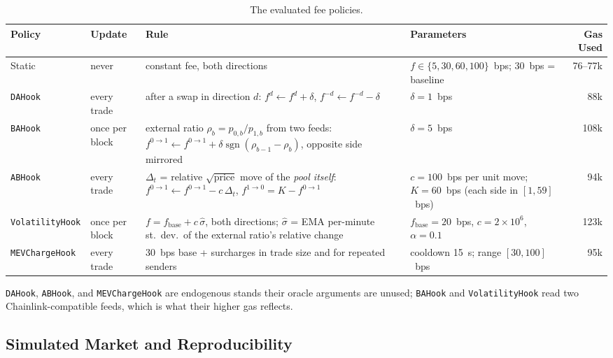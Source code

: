 \documentclass[a4paper,conference]{IEEEtran}
\begin{document}
\begin{table}[t]
  \caption{The evaluated fee policies.}
  \label{tab:policies}
  \centering
  \footnotesize
  \begin{tabular}{@{}llp{5.2cm}p{3.9cm}r@{}}
    \toprule
    \textbf{Policy} & \textbf{Update} & \textbf{Rule} &
    \textbf{Parameters} & \textbf{Gas Used}\\
    \midrule
    Static & never &
    constant fee, both directions &
    $f\in\{5,30,60,100\}$~bps; 30~bps = baseline &
    76--77k\\
    \addlinespace
    \texttt{DAHook} & every trade &
    after a swap in direction $d$:
    $f^{d}\!\leftarrow\! f^{d}\!+\!\delta$,
    $f^{-d}\!\leftarrow\! f^{-d}\!-\!\delta$ &
    $\delta=1$~bps &
    88k\\
    \addlinespace
    \texttt{BAHook} & once per block &
    external ratio $\rho_b=p_{0,b}/p_{1,b}$ from two feeds:
    $f^{0\to1}\!\leftarrow\! f^{0\to1}\!+\!\delta\operatorname{sgn}(\rho_{b-1}\!-\!\rho_b)$,
    opposite side mirrored &
    $\delta=5$~bps &
    108k\\
    \addlinespace
    \texttt{ABHook} & every trade &
    $\Delta_t$ = relative $\sqrt{\text{price}}$ move of the \emph{pool
    itself}: $f^{0\to1}\!\leftarrow\! f^{0\to1}\!-\!c\,\Delta_t$,
    $f^{1\to0}=K-f^{0\to1}$ &
    $c=100$~bps per unit move; $K=60$~bps (each side in $[1,59]$~bps) &
    94k\\
    \addlinespace
    \texttt{VolatilityHook} & once per block &
    $f=f_{\mathrm{base}}+c\,\hat{\sigma}$, both directions;
    $\hat{\sigma}$ = EMA per-minute st.\ dev.\ of the external ratio's
    relative change &
    $f_{\mathrm{base}}=20$~bps, $c=2\times10^{6}$, $\alpha=0.1$ &
    123k\\
    \addlinespace
    \texttt{MEVChargeHook} & every trade &
    30~bps base + surcharges in trade size and for repeated senders &
    cooldown 15~s; range $[30,100]$~bps &
    95k \\
    \bottomrule
  \end{tabular}
\end{table}

\texttt{DAHook}, \texttt{ABHook}, and \texttt{MEVChargeHook} are
endogenous stands their oracle arguments are unused; \texttt{BAHook} and
\texttt{VolatilityHook} read two Chainlink-compatible feeds, which is what their higher gas reflects.

\subsection{Simulated Market and Reproducibility}
\end{document}
